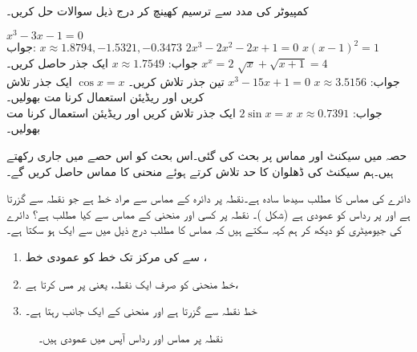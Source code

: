\\
کمپیوٹر کی مدد سے ترسیم کھینچ کر درج ذیل سوالات حل کریں۔

$x^3-3x-1=0$\\
جواب:\quad
$x\approx 1.8794, -1.5321,-0.3473$
$2x^3-2x^2-2x+1=0$
$x(x-1)^2=1$\\
جواب:\quad
$x\approx 1.7549$
ایک جذر حاصل کریں۔
$x^x=2$
$\sqrt{x}+\sqrt{x+1}=4$\\
جواب:\quad
$x\approx 3.5156$
$x^3-15x+1=0$
تین جذر تلاش کریں۔
$\cos x=x$
ایک جذر تلاش کریں اور ریڈیئن استعمال کرنا مت بھولیں۔\\
جواب:\quad
$x\approx 0.7391$
$2\sin x=x$
ایک جذر تلاش کریں اور ریڈیئن استعمال کرنا مت بھولیں۔


حصہ  میں سیکنٹ اور مماس پر بحث کی گئی۔اس بحث کو اس حصے میں جاری رکھتے ہیں۔ہم سیکنٹ کی ڈھلوان کا حد تلاش کرتے ہوئے منحنی کا مماس حاصل کریں گے۔

دائرے کی مماس  کا مطلب سیدھا سادہ ہے۔نقطہ  پر دائرہ  کے مماس سے مراد خط  ہے جو نقطہ  سے گزرتا ہے  اور   پر رداس کو عمودی  ہے (شکل )۔  نقطہ  پر کسی اور منحنی  کے مماس سے کیا مطلب ہے؟ دائرے کی جیومیٹری کو دیکھ کر ہم کہہ سکتے ہیں کہ مماس کا مطلب درج ذیل میں سے ایک ہو سکتا ہے۔
\begin{enumerate}[1.]
\item
{} سے  کی مرکز تک خط کو عمودی خط ،
\item
خط  منحنی  کو صرف ایک نقطہ، یعنی  پر مس کرتا ہے،
\item
 خط  نقطہ  سے گزرتا ہے اور منحنی  کے ایک جانب رہتا ہے۔ 
\end{enumerate} 
\begin{figure}
\centering
{}
\caption{
نقطہ  پر مماس اور رداس آپس میں عمودی ہیں۔
}
\label{شکل_حد_مماس_دائرہ}
\end{figure}

